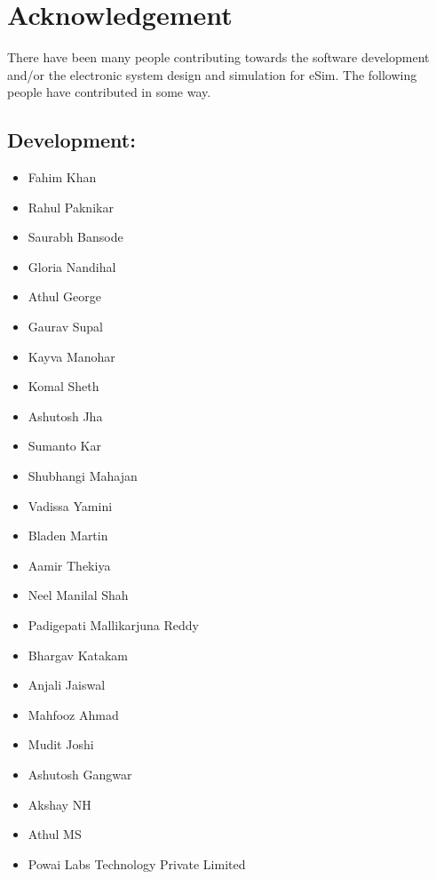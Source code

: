 \section*{Acknowledgement}

There  have  been  many  people contributing towards the software development and/or the electronic system design and simulation for eSim. The following people have contributed in some way.

\subsection*{Development:}
\begin{multicols}{3}
\begin{itemize}
    \item Fahim Khan
    \item Rahul Paknikar
    \item Saurabh Bansode
    \item Gloria Nandihal
    \item Athul George
    \item Gaurav Supal
    \item Kayva Manohar
    \item Komal Sheth


    \item Ashutosh Jha
    \item Sumanto Kar
    \item Shubhangi Mahajan
    \item Vadissa Yamini
    \item Bladen Martin
    \item Aamir Thekiya
    
    
    \item Neel Manilal Shah
    \item Padigepati Mallikarjuna Reddy
    \item Bhargav Katakam
    \item Anjali Jaiswal
    \item Mahfooz Ahmad
    
    \item Mudit Joshi
    \item Ashutosh Gangwar
    \item Akshay NH
    \item Athul MS
    
    
    \item Powai Labs Technology Private Limited

\end{itemize}
\end{multicols}

